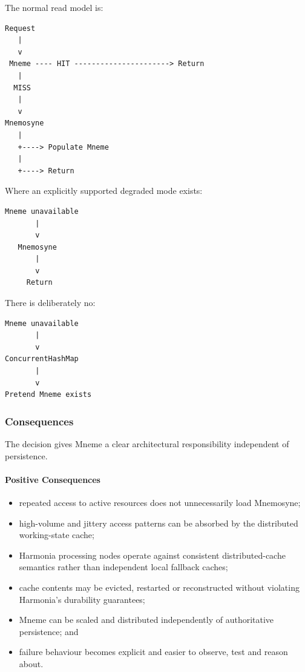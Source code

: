 The normal read model is:

\begin{verbatim}
Request
   |
   v
 Mneme ---- HIT ----------------------> Return
   |
  MISS
   |
   v
Mnemosyne
   |
   +----> Populate Mneme
   |
   +----> Return
\end{verbatim}

Where an explicitly supported degraded mode exists:

\begin{verbatim}
Mneme unavailable
       |
       v
   Mnemosyne
       |
       v
     Return
\end{verbatim}

There is deliberately no:

\begin{verbatim}
Mneme unavailable
       |
       v
ConcurrentHashMap
       |
       v
Pretend Mneme exists
\end{verbatim}

\subsubsection{Consequences}

The decision gives Mneme a clear architectural responsibility independent of persistence.

\paragraph{Positive Consequences}

\begin{itemize}
    \item repeated access to active resources does not unnecessarily load Mnemosyne;
    \item high-volume and jittery access patterns can be absorbed by the distributed working-state cache;
    \item Harmonia processing nodes operate against consistent distributed-cache semantics rather than independent local fallback caches;
    \item cache contents may be evicted, restarted or reconstructed without violating Harmonia's durability guarantees;
    \item Mneme can be scaled and distributed independently of authoritative persistence; and
    \item failure behaviour becomes explicit and easier to observe, test and reason about.
\end{itemize}

